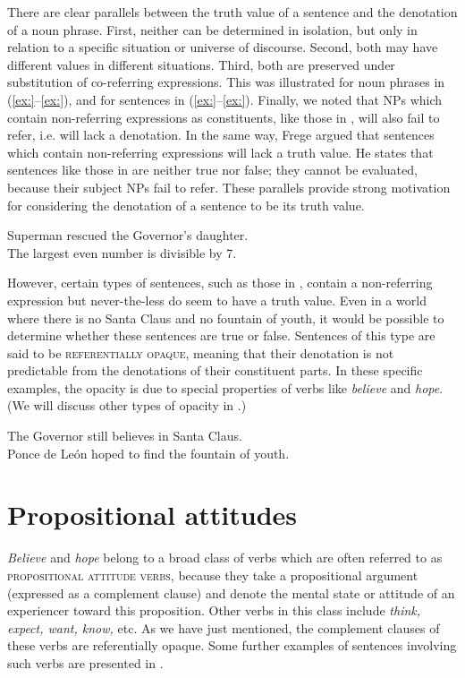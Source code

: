 There are clear parallels between the truth value of a sentence and the denotation of a noun phrase. First, neither can be determined in isolation, but only in relation to a specific situation or universe of discourse. Second, both may have different values in different situations. Third, both are preserved under substitution of co-referring expressions. This was illustrated for noun phrases in (\ref{ex:}--\ref{ex:}), and for sentences in (\ref{ex:}--\ref{ex:}). Finally, we noted that NPs which contain non-referring expressions as constituents, like those in , will also fail to refer, i.e. will lack a denotation. In the same way, Frege argued that sentences which contain non-referring expressions will lack a truth value. He states that sentences like those in  are neither true nor false; they cannot be evaluated, because their subject NPs fail to refer. These parallels provide strong motivation for considering the denotation of a sentence to be its truth value.


\ea
\ea Superman rescued the Governor’s daughter.\\
\ex The largest even number is divisible by 7.
                       \z
\z

However, certain types of sentences, such as those in , contain a non-referring expression but never-the-less do seem to have a truth value. Even in a world where there is no Santa Claus and no fountain of youth, it would be possible to determine whether these sentences are true or false. Sentences of this type are said to be \textsc{referentially opaque}, meaning that their denotation is not predictable from the denotations of their constituent parts. In these specific examples, the opacity is due to special properties of verbs like \textit{believe} and \textit{hope}. (We will discuss other types of opacity in .)

\ea
\ea The Governor still believes in Santa Claus.\\
\ex Ponce de León hoped to find the fountain of youth.
                       \z
\z

\section{Propositional attitudes}\label{sec:12.4}

\textit{Believe} and \textit{hope} belong to a broad class of verbs which are often referred to as \textsc{propositional attitude verbs}, because they take a propositional argument (expressed as a complement clause) and denote the mental state or attitude of an experiencer toward this proposition. Other verbs in this class include \textit{think, expect, want, know,} etc. As we have just mentioned, the complement clauses of these verbs are referentially opaque. Some further examples of sentences involving such verbs are presented in .


